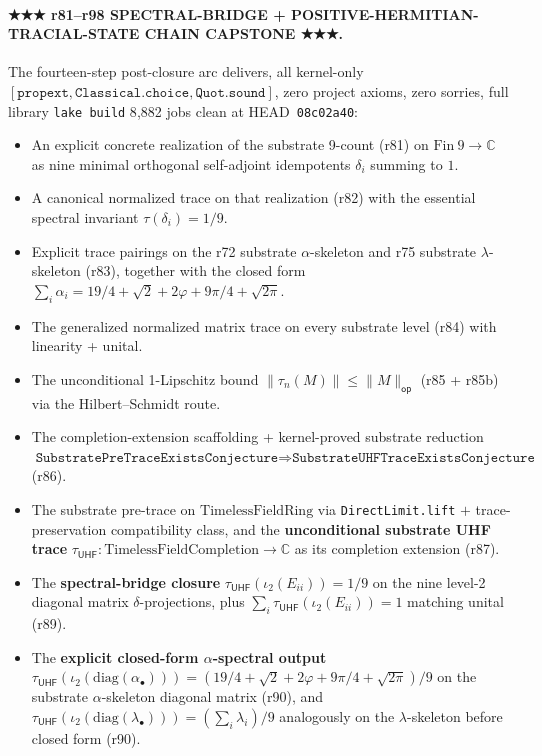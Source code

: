 \documentclass[11pt,a4paper]{amsart}
\theoremstyle{plain}
\theoremstyle{definition}
\begin{document}
\paragraph{★★★ r81--r98 SPECTRAL-BRIDGE + POSITIVE-HERMITIAN-TRACIAL-STATE CHAIN CAPSTONE ★★★.} The fourteen-step post-closure arc delivers, all kernel-only $[\texttt{propext}, \texttt{Classical.choice}, \texttt{Quot.sound}]$, zero project axioms, zero sorries, full library \texttt{lake build} 8{,}882 jobs clean at HEAD~\texttt{08c02a40}:
\begin{itemize}[itemsep=2pt,leftmargin=2em]
\item An explicit concrete realization of the substrate 9-count (r81) on $\mathrm{Fin}~9 \to \mathbb{C}$ as nine minimal orthogonal self-adjoint idempotents $\delta_i$ summing to $1$.
\item A canonical normalized trace on that realization (r82) with the essential spectral invariant $\tau(\delta_i) = 1/9$.
\item Explicit trace pairings on the r72 substrate $\alpha$-skeleton and r75 substrate $\lambda$-skeleton (r83), together with the closed form $\sum_i \alpha_i = 19/4 + \sqrt{2} + 2\varphi + 9\pi/4 + \sqrt{2\pi}$.
\item The generalized normalized matrix trace on every substrate level (r84) with linearity + unital.
\item The unconditional 1-Lipschitz bound $\|\tau_n(M)\| \le \|M\|_{\textsf{op}}$ (r85 + r85b) via the Hilbert--Schmidt route.
\item The completion-extension scaffolding + kernel-proved substrate reduction $\texttt{SubstratePreTraceExistsConjecture} \Rightarrow \texttt{SubstrateUHFTraceExistsConjecture}$ (r86).
\item The substrate pre-trace on $\mathrm{TimelessFieldRing}$ via \texttt{DirectLimit.lift} $+$ trace-preservation compatibility class, and the \textbf{unconditional substrate UHF trace} $\tau_{\textsf{UHF}} \colon \mathrm{TimelessFieldCompletion} \to \mathbb{C}$ as its completion extension (r87).
\item The \textbf{spectral-bridge closure} $\tau_{\textsf{UHF}}(\iota_2(E_{ii})) = 1/9$ on the nine level-2 diagonal matrix $\delta$-projections, plus $\sum_i \tau_{\textsf{UHF}}(\iota_2(E_{ii})) = 1$ matching unital (r89).
\item The \textbf{explicit closed-form $\alpha$-spectral output} $\tau_{\textsf{UHF}}(\iota_2(\mathrm{diag}(\alpha_\bullet))) = (19/4 + \sqrt{2} + 2\varphi + 9\pi/4 + \sqrt{2\pi})/9$ on the substrate $\alpha$-skeleton diagonal matrix (r90), and $\tau_{\textsf{UHF}}(\iota_2(\mathrm{diag}(\lambda_\bullet))) = (\sum_i \lambda_i)/9$ analogously on the $\lambda$-skeleton before closed form (r90).

\end{itemize}
\end{document}
